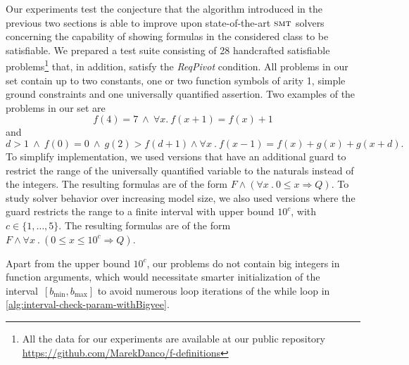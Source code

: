 \documentclass[runningheads]{llncs}
\newcommand{\smt}{\textsc{smt}}
\newcommand{\req}{\emph{ReqPivot}\xspace}
\begin{document}
Our experiments test the conjecture that the algorithm introduced in the previous two sections is able to improve
upon state-of-the-art $\smt$ solvers concerning the capability of showing formulas in the considered class to be satisfiable.
We prepared a test suite consisting of 28 handcrafted satisfiable
problems\footnote{All the data for our experiments are available at our public repository \\\url{https://github.com/MarekDanco/f-definitions}}
that, in addition, satisfy the \req condition. All problems in our set contain up to two constants, one or two function
symbols of arity 1, simple ground constraints and one universally quantified assertion.
Two examples of the problems in our set are
\begin{equation}\label{eq:exp1}
	f(4)=7 \:\land\: \forall x.\: f(x+1)=f(x)+1
\end{equation}  %
and
\begin{equation}\label{eq:exp2}
	d > 1\:\land\: f(0)=0 \:\land\: g(2) > f(d+1) \land\forall x \:.\: f(x-1)=f(x)+g(x)+g(x+d).
\end{equation}
To simplify implementation, we used versions that have an additional guard to restrict the range of the universally quantified variable to the naturals instead of the integers. The resulting formulas are of the form $F\land (\forall x \:.\: 0\leq x \Rightarrow Q)$. To study solver behavior over increasing model size, we also used versions where the guard restricts the range to a finite interval with upper bound $10^c$, with  $c\in \{1,\dots,5\}$. The resulting formulas are of the form  $F\land \forall x \:.\: (0\leq x \leq 10^c\Rightarrow Q)$.

Apart from the upper bound $10^c$, our problems do not contain big integers in function arguments, which would necessitate smarter initialization of the interval~$[b_{\min},b_{\max}]$ to avoid numerous loop iterations of the while loop in \cref{alg:interval-check-param-withBigvee}.
\end{document}
